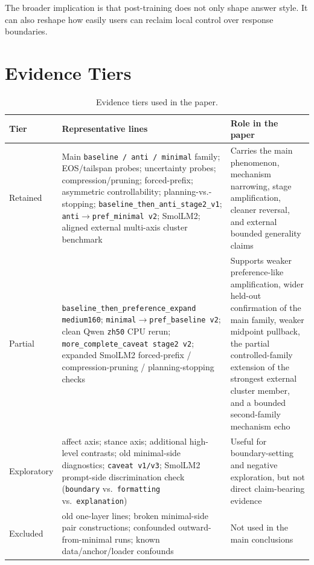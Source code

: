 \documentclass[11pt]{article}
\begin{document}
The broader implication is that post-training does not only shape answer style. It can also reshape how easily users can reclaim local control over response boundaries.

\appendix

\section{Evidence Tiers}

\begin{table}[t]
\centering
\caption{Evidence tiers used in the paper.}
\label{tab:evidence-tiering}
\begin{tabular}{p{2.0cm}p{4.5cm}p{8.3cm}}
\toprule
Tier & Representative lines & Role in the paper \\
\midrule
Retained & Main \texttt{baseline / anti / minimal} family; EOS/tailspan probes; uncertainty probes; compression/pruning; forced-prefix; asymmetric controllability; planning-vs.-stopping; \texttt{baseline\_then\_anti\_stage2\_v1}; \texttt{anti$\rightarrow$pref\_minimal v2}; SmolLM2; aligned external multi-axis cluster benchmark & Carries the main phenomenon, mechanism narrowing, stage amplification, cleaner reversal, and external bounded generality claims \\
Partial & \texttt{baseline\_then\_preference\_expand medium160}; \texttt{minimal$\rightarrow$pref\_baseline v2}; clean Qwen \texttt{zh50} CPU rerun; \texttt{more\_complete\_caveat stage2 v2}; expanded SmolLM2 forced-prefix / compression-pruning / planning-stopping checks & Supports weaker preference-like amplification, wider held-out confirmation of the main family, weaker midpoint pullback, the partial controlled-family extension of the strongest external cluster member, and a bounded second-family mechanism echo \\
Exploratory & affect axis; stance axis; additional high-level contrasts; old minimal-side diagnostics; \texttt{caveat v1/v3}; SmolLM2 prompt-side discrimination check (\texttt{boundary} vs.\ \texttt{formatting} vs.\ \texttt{explanation}) & Useful for boundary-setting and negative exploration, but not direct claim-bearing evidence \\
Excluded & old one-layer lines; broken minimal-side pair constructions; confounded outward-from-minimal runs; known data/anchor/loader confounds & Not used in the main conclusions \\
\bottomrule
\end{tabular}
\end{table}
\end{document}
